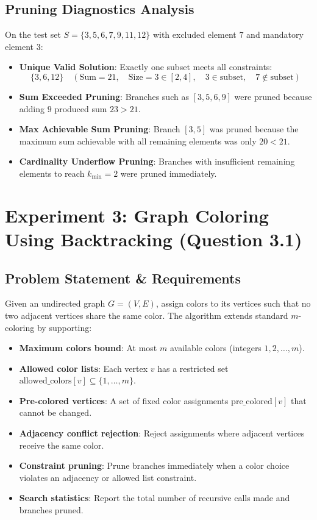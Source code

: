 \documentclass[12pt]{article}
\begin{document}
\subsection{Pruning Diagnostics Analysis}
On the test set $S=\{3,5,6,7,9,11,12\}$ with excluded element $7$ and mandatory element $3$:
\begin{itemize}
    \item \textbf{Unique Valid Solution}: Exactly one subset meets all constraints:
    $$\{3, 6, 12\} \quad (\text{Sum} = 21, \quad \text{Size} = 3 \in [2, 4], \quad 3 \in \text{subset}, \quad 7 \notin \text{subset})$$
    \item \textbf{Sum Exceeded Pruning}: Branches such as $[3, 5, 6, 9]$ were pruned because adding $9$ produced sum $23 > 21$.
    \item \textbf{Max Achievable Sum Pruning}: Branch $[3, 5]$ was pruned because the maximum sum achievable with all remaining elements was only $20 < 21$.
    \item \textbf{Cardinality Underflow Pruning}: Branches with insufficient remaining elements to reach $k_{\min}=2$ were pruned immediately.
\end{itemize}

\section{Experiment 3: Graph Coloring Using Backtracking (Question 3.1)}

\subsection{Problem Statement \& Requirements}
Given an undirected graph $G = (V, E)$, assign colors to its vertices such that no two adjacent vertices share the same color. The algorithm extends standard $m$-coloring by supporting:
\begin{itemize}
    \item \textbf{Maximum colors bound}: At most $m$ available colors (integers $1, 2, \dots, m$).
    \item \textbf{Allowed color lists}: Each vertex $v$ has a restricted set $\text{allowed\_colors}[v] \subseteq \{1, \dots, m\}$.
    \item \textbf{Pre-colored vertices}: A set of fixed color assignments $\text{pre\_colored}[v]$ that cannot be changed.
    \item \textbf{Adjacency conflict rejection}: Reject assignments where adjacent vertices receive the same color.
    \item \textbf{Constraint pruning}: Prune branches immediately when a color choice violates an adjacency or allowed list constraint.
    \item \textbf{Search statistics}: Report the total number of recursive calls made and branches pruned.
\end{itemize}
\end{document}
